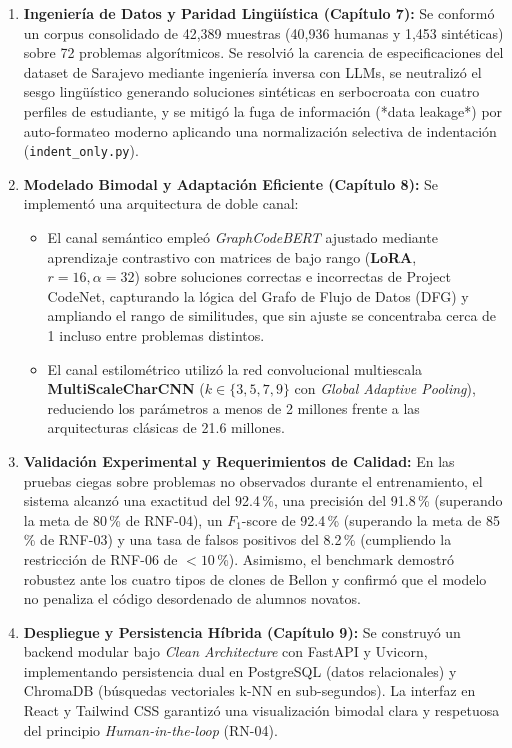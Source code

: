 \begin{enumerate}
    \item \textbf{Ingeniería de Datos y Paridad Lingüística (Capítulo 7):} Se conformó un corpus consolidado de 42,389 muestras (40,936 humanas y 1,453 sintéticas) sobre 72 problemas algorítmicos. Se resolvió la carencia de especificaciones del dataset de Sarajevo mediante ingeniería inversa con LLMs, se neutralizó el sesgo lingüístico generando soluciones sintéticas en serbocroata con cuatro perfiles de estudiante, y se mitigó la fuga de información (*data leakage*) por auto-formateo moderno aplicando una normalización selectiva de indentación (\texttt{indent\_only.py}).
    
    \item \textbf{Modelado Bimodal y Adaptación Eficiente (Capítulo 8):} Se implementó una arquitectura de doble canal:
    \begin{itemize}
        \item El canal semántico empleó \textit{GraphCodeBERT} ajustado mediante aprendizaje contrastivo con matrices de bajo rango (\textbf{LoRA}, $r=16, \alpha=32$) sobre soluciones correctas e incorrectas de Project CodeNet, capturando la lógica del Grafo de Flujo de Datos (DFG) y ampliando el rango de similitudes, que sin ajuste se concentraba cerca de 1 incluso entre problemas distintos.
        \item El canal estilométrico utilizó la red convolucional multiescala \textbf{MultiScaleCharCNN} ($k \in \{3, 5, 7, 9\}$ con \textit{Global Adaptive Pooling}), reduciendo los parámetros a menos de 2 millones frente a las arquitecturas clásicas de 21.6 millones.
    \end{itemize}
    
    \item \textbf{Validación Experimental y Requerimientos de Calidad:} En las pruebas ciegas sobre problemas no observados durante el entrenamiento, el sistema alcanzó una exactitud del 92.4\,\%, una precisión del 91.8\,\% (superando la meta de 80\,\% de RNF-04), un $F_1$-score de 92.4\,\% (superando la meta de 85\,\% de RNF-03) y una tasa de falsos positivos del 8.2\,\% (cumpliendo la restricción de RNF-06 de $< 10$\,\%). Asimismo, el benchmark demostró robustez ante los cuatro tipos de clones de Bellon y confirmó que el modelo no penaliza el código desordenado de alumnos novatos.
    
    \item \textbf{Despliegue y Persistencia Híbrida (Capítulo 9):} Se construyó un backend modular bajo \textit{Clean Architecture} con FastAPI y Uvicorn, implementando persistencia dual en PostgreSQL (datos relacionales) y ChromaDB (búsquedas vectoriales k-NN en sub-segundos). La interfaz en React y Tailwind CSS garantizó una visualización bimodal clara y respetuosa del principio \textit{Human-in-the-loop} (RN-04).
\end{enumerate}


